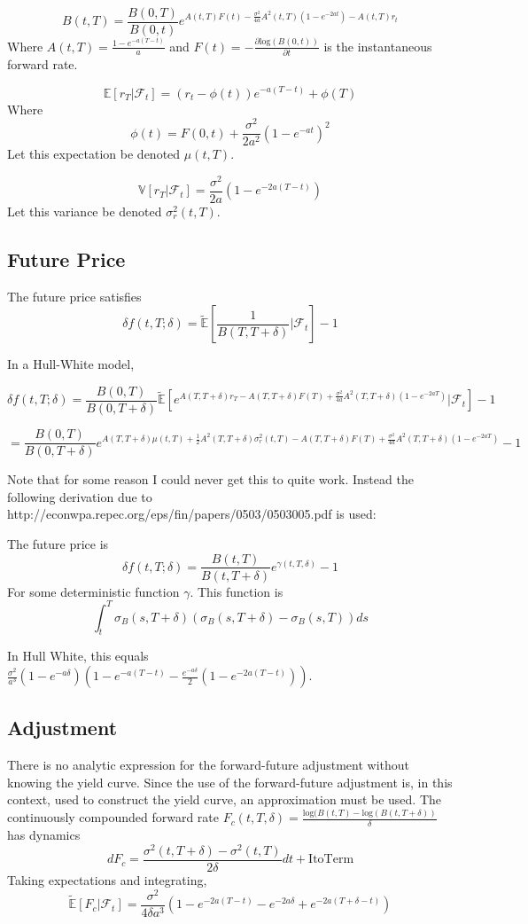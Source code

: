 \documentclass{article}
\theoremstyle{definition}
\begin{document}
\[B(t, T)=\frac{B(0, T)}{B(0, t)}e^{A(t, T)F(t)-\frac{\sigma^2}{4a}A^2 (t, T)\left(1-e^{-2at}\right)-A(t, T)r_t}\]
Where \(A(t, T)=\frac{1-e^{-a(T-t)}}{a}\) and \(F(t)=-\frac{\partial \mathrm{log}(B(0, t))}{\partial t}\) is the instantaneous forward rate.

\[\mathbb{E}\left[r_T|\mathcal{F}_t\right]=\left(r_t-\phi(t)\right) e^{-a(T-t)}+\phi(T)\]
Where 
\[\phi(t)=F(0, t)+\frac{\sigma^2}{2a^2}\left(1-e^{-at}\right)^2\]
Let this expectation be denoted \(\mu(t, T)\).  

\[\mathbb{V}\left[r_T|\mathcal{F}_t\right]=\frac{\sigma^2}{2a}\left(1-e^{-2a(T-t)}\right)\]
Let this variance be denoted \(\sigma^2_r(t, T)\). 


\subsection{Future Price}

The future price satisfies \[\delta f(t, T; \delta)=\tilde{\mathbb{E}}\left[\frac{1}{B(T, T+\delta)}|\mathcal{F}_t\right]-1\]

In a Hull-White model, 

\[\delta f(t, T; \delta)=\frac{B(0, T)}{B(0, T+\delta)}\tilde{\mathbb{E}}\left[e^{A(T, T+\delta)r_T-A(T, T+\delta)F(T)+\frac{\sigma^2}{4a}A^2 (T, T+\delta)\left(1-e^{-2aT}\right)}|\mathcal{F}_t\right]-1\]

\[=\frac{B(0, T)}{B(0, T+\delta)}e^{A(T, T+\delta)\mu(t, T)+\frac{1}{2}A^2(T, T+\delta)\sigma^2_r(t, T)-A(T, T+\delta)F(T)+\frac{\sigma^2}{4a}A^2 (T, T+\delta)\left(1-e^{-2aT}\right)}-1\]

Note that for some reason I could never get this to quite work.  Instead the following derivation due to 
http://econwpa.repec.org/eps/fin/papers/0503/0503005.pdf is used:

The future price is \[\delta f(t, T; \delta)=\frac{B(t, T)}{B(t, T+\delta)}e^{\gamma(t, T, \delta)}-1\]
For some deterministic function \(\gamma\).  This function is \[\int_t ^ T \sigma_B (s, T+\delta)\left(\sigma_B(s, T+\delta)-\sigma_B(s, T)\right)ds\]

In Hull White, this equals \(\frac{\sigma^2}{a^3}\left(1-e^{-a\delta}\right)\left(1-e^{-a(T-t)}-\frac{e^{-a\delta}}{2}\left(1-e^{-2a(T-t)}\right)\right)\).
\subsection{Adjustment}
There is no analytic expression for the forward-future adjustment without knowing the yield curve.  Since the use of the forward-future adjustment is, in this context, used to construct the yield curve, an approximation must be used.  The continuously compounded forward rate \(F_c (t, T, \delta)=\frac{\mathrm{log}(B(t, T)-\mathrm{log}(B(t, T+\delta))}{\delta}\) has dynamics 
\[dF_c=\frac{\sigma^2(t, T+\delta)-\sigma^2(t, T)}{2\delta} dt + \mathrm{Ito Term}\]
Taking expectations and integrating, 
\[\mathbb{\tilde{E}}[F_c|\mathcal{F}_t]=\frac{\sigma^2}{4\delta a^3}\left(1-e^{-2a(T-t)}-e^{-2a\delta}+e^{-2a(T+\delta-t)}\right)\]
\end{document}
